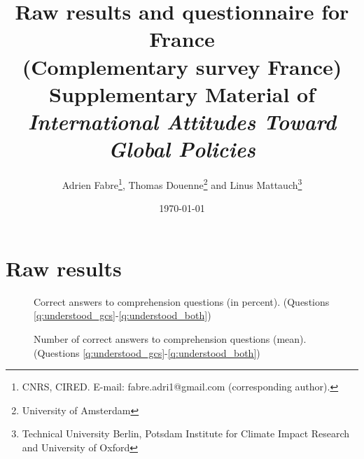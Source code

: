 \documentclass[12pt,english]{article}
\title{Raw results and questionnaire for France \\
(Complementary survey France) \\ 
Supplementary Material of \\
\textit{International Attitudes Toward Global Policies}
}
\author{Adrien Fabre\footnote{CNRS, CIRED. E-mail: fabre.adri1@gmail.com (corresponding author).}, Thomas Douenne\footnote{University of Amsterdam}\; and Linus Mattauch\footnote{Technical University Berlin, Potsdam Institute for Climate Impact Research and University of Oxford}} %
\date{\today} %
\begin{document}
\maketitle

\tableofcontents

\clearpage
\listoffigures


\clearpage
\section{Raw results}\label{app:raw_results_FR}

\begin{figure}[h!]
    \caption[Comprehension]{Correct answers to comprehension questions (in percent). (Questions \ref{q:understood_gcs}-\ref{q:understood_both})}\label{fig:understood_each}
\end{figure}

\begin{figure}[h!]
    \caption[Comprehension score]{Number of correct answers to comprehension questions (mean). (Questions \ref{q:understood_gcs}-\ref{q:understood_both})}\label{fig:understood_score}
\end{figure}
\end{document}
